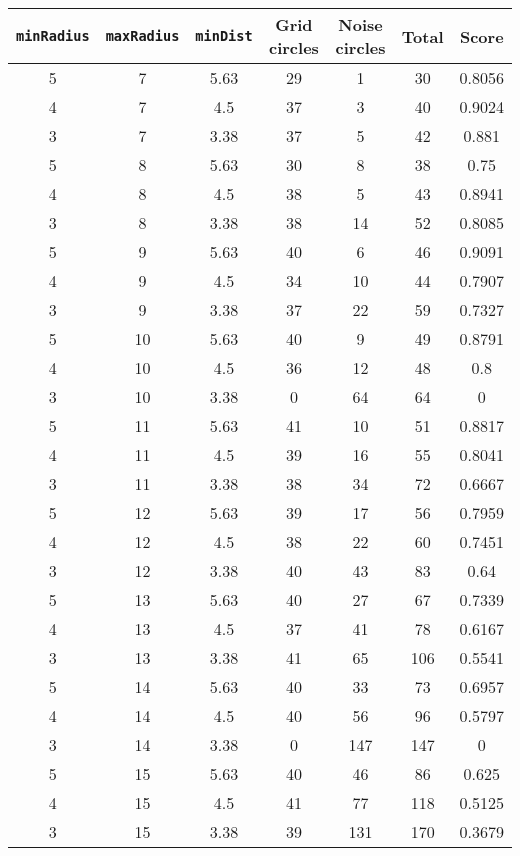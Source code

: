 \documentclass[letterpaper, 12pt]{article}
\begin{document}
\begin{longtable}{|c|c|c|c|c|c|c|}
\hline
\textbf{\texttt{minRadius}} & \textbf{\texttt{maxRadius}} & \textbf{\texttt{minDist}} & \textbf{Grid circles} & \textbf{Noise circles} & \textbf{Total} & \textbf{Score} \\
\hline
5 & 7 & 5.63 & 29 & 1 & 30 & 0.8056 \\
\hline
4 & 7 & 4.5 & 37 & 3 & 40 & 0.9024 \\
\hline
3 & 7 & 3.38 & 37 & 5 & 42 & 0.881 \\
\hline
5 & 8 & 5.63 & 30 & 8 & 38 & 0.75 \\
\hline
4 & 8 & 4.5 & 38 & 5 & 43 & 0.8941 \\
\hline
3 & 8 & 3.38 & 38 & 14 & 52 & 0.8085 \\
\hline
5 & 9 & 5.63 & 40 & 6 & 46 & 0.9091 \\
\hline
4 & 9 & 4.5 & 34 & 10 & 44 & 0.7907 \\
\hline
3 & 9 & 3.38 & 37 & 22 & 59 & 0.7327 \\
\hline
5 & 10 & 5.63 & 40 & 9 & 49 & 0.8791 \\
\hline
4 & 10 & 4.5 & 36 & 12 & 48 & 0.8 \\
\hline
3 & 10 & 3.38 & 0 & 64 & 64 & 0 \\
\hline
5 & 11 & 5.63 & 41 & 10 & 51 & 0.8817 \\
\hline
4 & 11 & 4.5 & 39 & 16 & 55 & 0.8041 \\
\hline
3 & 11 & 3.38 & 38 & 34 & 72 & 0.6667 \\
\hline
5 & 12 & 5.63 & 39 & 17 & 56 & 0.7959 \\
\hline
4 & 12 & 4.5 & 38 & 22 & 60 & 0.7451 \\
\hline
3 & 12 & 3.38 & 40 & 43 & 83 & 0.64 \\
\hline
5 & 13 & 5.63 & 40 & 27 & 67 & 0.7339 \\
\hline
4 & 13 & 4.5 & 37 & 41 & 78 & 0.6167 \\
\hline
3 & 13 & 3.38 & 41 & 65 & 106 & 0.5541 \\
\hline
5 & 14 & 5.63 & 40 & 33 & 73 & 0.6957 \\
\hline
4 & 14 & 4.5 & 40 & 56 & 96 & 0.5797 \\
\hline
3 & 14 & 3.38 & 0 & 147 & 147 & 0 \\
\hline
5 & 15 & 5.63 & 40 & 46 & 86 & 0.625 \\
\hline
4 & 15 & 4.5 & 41 & 77 & 118 & 0.5125 \\
\hline
3 & 15 & 3.38 & 39 & 131 & 170 & 0.3679 \\

\end{longtable}
\end{document}
